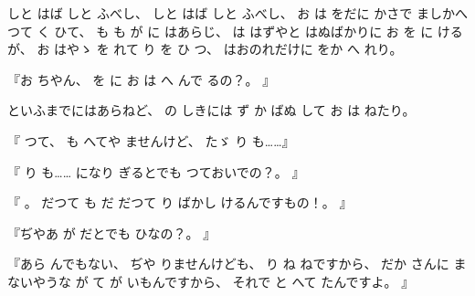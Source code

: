 
%
しと
はば
しと
ふべし、
%
しと
はば
しと
ふべし、
%
お
は
をだに
かさで
ましかへつて
く
ひて、
%
も
も
が
に
はあらじ、
%
は
はずやと
はぬばかりに
お
を
に
けるが、
%
お
はやゝ
を
れて
り
を
ひ
つ、
%
はおのれだけに
をか
へ
れり。

%
『お
ちやん、
%
を
に
お
は
へ
んで
るの？。
』

%
といふまでにはあらねど、
%
の
しきには
ず
か
ばぬ
して
お
は
ねたり。

%
『
つて、
%
も
へてや
ませんけど、
%
たゞ
り
も……』

%
『
り
も……
になり
ぎるとでも
つておいでの？。
』

%
『
。
%
だつて
も
だ
だつて
り
ばかし
けるんですもの！。
』

%
『ぢやあ
が
だとでも
ひなの？。
』

%
『あら
んでもない、
%
ぢや
りませんけども、
%
り
ね
ねですから、
%
だか
さんに
まないやうな
が
て
が
いもんですから、
%
それで
と
へて
たんですよ。
』

